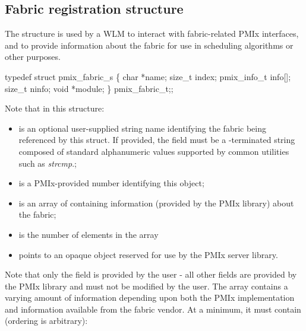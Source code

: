 \subsection{Fabric registration structure}

The  structure is used by a \ac{WLM} to interact with fabric-related \ac{PMIx} interfaces, and to provide information about the fabric for use in scheduling algorithms or other purposes.

\cspecificstart
\begin{codepar}
typedef struct pmix_fabric_s \{
    char *name;
    size_t index;
    pmix_info_t info[];
    size_t ninfo;
    void *module;
\} pmix_fabric_t;;
\end{codepar}
\cspecificend

Note that in this structure:

\begin{itemize}
    \item {} is an optional user-supplied string name identifying the fabric being referenced by this struct. If provided, the field must be a -terminated string composed of standard alphanumeric values supported by common utilities such as \textit{strcmp}.;
    \item {} is a \ac{PMIx}-provided number identifying this object;
    \item {} is an array of  containing information (provided by the \ac{PMIx} library) about the fabric;
    \item {} is the number of elements in the  array
    \item {} points to an opaque object reserved for use by the \ac{PMIx} server library.
\end{itemize}

Note that only the  field is provided by the user - all other fields are provided by the \ac{PMIx} library and must not be modified by the user. The  array contains a varying amount of information depending upon both the \ac{PMIx} implementation and information available from the fabric vendor. At a minimum, it must contain (ordering is arbitrary):

\reqattrstart


